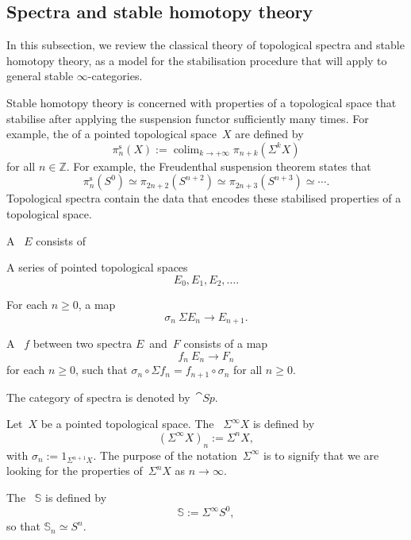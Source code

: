 \subsection{Spectra and stable homotopy theory}

In this subsection, we review the classical theory of
topological spectra and stable homotopy theory,
as a model for the stabilisation procedure that will
apply to general stable $\infty$-categories.

Stable homotopy theory is concerned with properties of a topological space 
that stabilise after applying the suspension functor sufficiently many times.
For example, the  of a pointed topological space~$X$
are defined by 
\[\pi_n^{\mathrm s}(X):=
\mathop{\operatorname{colim}}_{k\to+\infty} \pi_{n+k}(\Sigma^kX)\]
for all $n\in\mathbb{Z}$.
For example, the Freudenthal suspension theorem states that 
\[\pi_n^{\mathrm s}(S^0)\simeq\pi_{2n+2}(S^{n+2})
\simeq\pi_{2n+3}(S^{n+3})\simeq\cdots.\]
Topological spectra contain the data that encodes
these stabilised properties of a topological space.

\begin{definition}
    A ~$E$ consists of
    \begin{itms}
        \item A series of pointed topological spaces 
        \[E_0,E_1,E_2,\dotsc.\]
        \item For each $n\geq0$, a map 
        \[\sigma_n\:\Sigma E_n\to E_{n+1}.\]
    \end{itms}
    A ~$f$ between two spectra $E$~and~$F$
    consists of a map
    \[f_n\:E_n\to F_n\]
    for each $n\geq0$,
    such that $\sigma_n\circ\Sigma f_n=f_{n+1}\circ\sigma_n$ for all $n\geq0$.
\end{definition}

The category of spectra is denoted by~$\cat{Sp}$.

\begin{example}
    Let~$X$ be a pointed topological space.
    The ~$\Sigma^\infty X$ is defined by 
    \[ (\Sigma^\infty X)_n:=\Sigma^nX, \]
    with $\sigma_n:=1_{\Sigma^{n+1}X}$.
    The purpose of the notation~$\Sigma^\infty$ is to signify that 
    we are looking for the properties of~$\Sigma^nX$ as $n\to\infty$.

    The ~$\mathbb{S}$ is defined by
    \[ \mathbb{S}:=\Sigma^\infty S^0, \]
    so that $\mathbb{S}_n\simeq S^n$. \varqed
\end{example}

